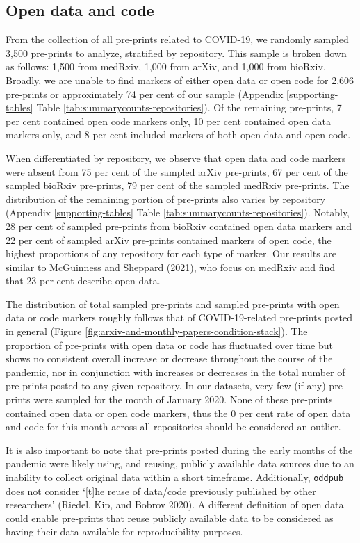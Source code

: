 \documentclass[
]{article}
\begin{document}
\hypertarget{open-data-and-code}{%
\subsection{Open data and code}\label{open-data-and-code}}

From the collection of all pre-prints related to COVID-19, we randomly sampled 3,500 pre-prints to analyze, stratified by repository. This sample is broken down as follows: 1,500 from medRxiv, 1,000 from arXiv, and 1,000 from bioRxiv. Broadly, we are unable to find markers of either open data or open code for 2,606 pre-prints or approximately 74 per cent of our sample (Appendix \ref{supporting-tables} Table \ref{tab:summarycounts-repositories}). Of the remaining pre-prints, 7 per cent contained open code markers only, 10 per cent contained open data markers only, and 8 per cent included markers of both open data and open code.

When differentiated by repository, we observe that open data and code markers were absent from 75 per cent of the sampled arXiv pre-prints, 67 per cent of the sampled bioRxiv pre-prints, 79 per cent of the sampled medRxiv pre-prints. The distribution of the remaining portion of pre-prints also varies by repository (Appendix \ref{supporting-tables} Table \ref{tab:summarycounts-repositories}). Notably, 28 per cent of sampled pre-prints from bioRxiv contained open data markers and 22 per cent of sampled arXiv pre-prints contained markers of open code, the highest proportions of any repository for each type of marker. Our results are similar to McGuinness and Sheppard (2021), who focus on medRxiv and find that 23 per cent describe open data.

The distribution of total sampled pre-prints and sampled pre-prints with open data or code markers roughly follows that of COVID-19-related pre-prints posted in general (Figure \ref{fig:arxiv-and-monthly-papers-condition-stack}). The proportion of pre-prints with open data or code has fluctuated over time but shows no consistent overall increase or decrease throughout the course of the pandemic, nor in conjunction with increases or decreases in the total number of pre-prints posted to any given repository. In our datasets, very few (if any) pre-prints were sampled for the month of January 2020. None of these pre-prints contained open data or open code markers, thus the 0 per cent rate of open data and code for this month across all repositories should be considered an outlier.

It is also important to note that pre-prints posted during the early months of the pandemic were likely using, and reusing, publicly available data sources due to an inability to collect original data within a short timeframe. Additionally, \texttt{oddpub} does not consider `{[}t{]}he reuse of data/code previously published by other researchers' (Riedel, Kip, and Bobrov 2020). A different definition of open data could enable pre-prints that reuse publicly available data to be considered as having their data available for reproducibility purposes.
\end{document}

